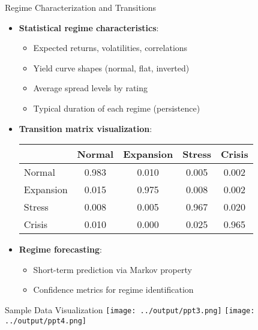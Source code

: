 \documentclass{beamer}
\begin{document}
\begin{frame}{Regime Characterization and Transitions}
\begin{itemize}
    \item \textbf{Statistical regime characteristics}:
    \begin{itemize}
        \item Expected returns, volatilities, correlations
        \item Yield curve shapes (normal, flat, inverted)
        \item Average spread levels by rating
        \item Typical duration of each regime (persistence)
    \end{itemize}
    \item \textbf{Transition matrix visualization}:
    
    \begin{center}
    \scriptsize
    \begin{tabular}{l|cccc}
    \toprule
    & Normal & Expansion & Stress & Crisis \\
    \midrule
    Normal & 0.983 & 0.010 & 0.005 & 0.002 \\
    Expansion & 0.015 & 0.975 & 0.008 & 0.002 \\
    Stress & 0.008 & 0.005 & 0.967 & 0.020 \\
    Crisis & 0.010 & 0.000 & 0.025 & 0.965 \\
    \bottomrule
    \end{tabular}
    \end{center}
    
    \item \textbf{Regime forecasting}:
    \begin{itemize}
        \item Short-term prediction via Markov property
        \item Confidence metrics for regime identification
    \end{itemize}
\end{itemize}
\end{frame}


\begin{frame}{Sample Data Visualization}
    \centering
    \texttt{[image: ../output/ppt3.png]}
    \texttt{[image: ../output/ppt4.png]}
\end{frame}


    
\end{document}
